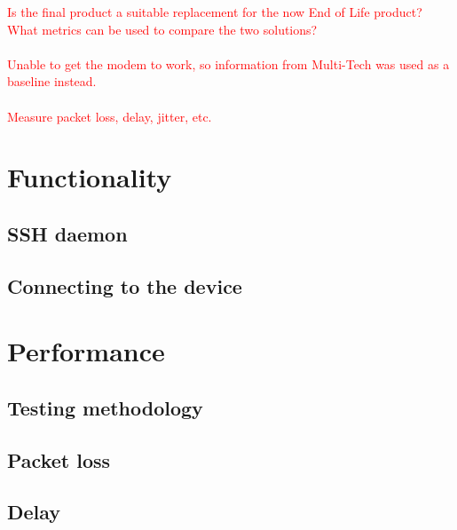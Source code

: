 \textcolor{red}{
Is the final product a suitable replacement for the now End of Life product? What metrics can be used to compare the two solutions? \\\\
Unable to get the modem to work, so information from Multi-Tech was used as a baseline instead. \\\\
Measure packet loss, delay, jitter, etc.
}

\section{Functionality}
\label{section:testing-functionality}
\subsection{SSH daemon}
\label{subsection:testing-functionality-sshdaemon}
\subsection{Connecting to the device}
\label{subsection:testing-functionality-connection}

\section{Performance}
\label{section:testing-performance}
\subsection{Testing methodology}
\label{subsection:testing-performance-methodology}
\subsection{Packet loss}
\label{subsection:testing-performance-packetloss}
\subsection{Delay}
\label{subsection:testing-performance-delay}